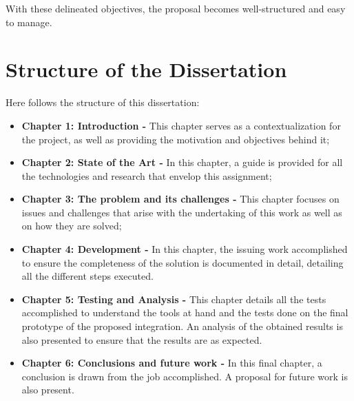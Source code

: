 With these delineated objectives, the proposal becomes well-structured and easy to manage.


\section{Structure of the Dissertation}

Here follows the structure of this dissertation:

\begin{itemize}

    \item \textbf{Chapter 1: Introduction -} This chapter serves as a contextualization for the project, as well as providing the motivation and objectives behind it;

    \item \textbf{Chapter 2: State of the Art -} In this chapter, a guide is provided for all the technologies and research that envelop this assignment;

    \item \textbf{Chapter 3: The problem and its challenges -} This chapter focuses on issues and challenges that arise with the undertaking of this work as well as on how they are solved;

    \item \textbf{Chapter 4: Development -} In this chapter, the issuing work accomplished to ensure the completeness of the solution is documented in detail, detailing all the different steps executed.

    \item \textbf{Chapter 5: Testing and Analysis -} This chapter details all the tests accomplished to understand the tools at hand and the tests done on the final prototype of the proposed integration. An analysis of the obtained results is also presented to ensure that the results are as expected.

    \item \textbf{Chapter 6: Conclusions and future work -} In this final chapter, a conclusion is drawn from the job accomplished. A proposal for future work is also present.
    
\end{itemize}